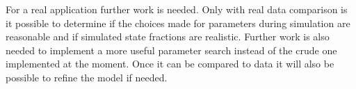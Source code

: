 For a real application further work is needed. Only with real data comparison is it possible to determine if the choices made for parameters during simulation are reasonable and if simulated state fractions are realistic. Further work is also needed to implement a more useful parameter search instead of the crude one implemented at the moment. Once it can be compared to data it will also be possible to refine the model if needed. 


